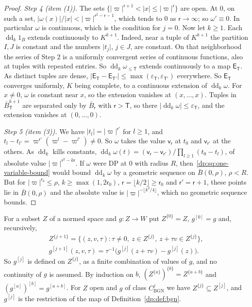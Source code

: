 \documentclass[11pt]{amsart}
\theoremstyle{definition}
\theoremstyle{remark}
\numberwithin{equation}{section}
\newcommand{\abs}[1]{\lvert #1\rvert}
\theoremstyle{plain}
\theoremstyle{definition}
\theoremstyle{plain}
\begin{document}
\begin{proof}
\emph{Step 4 (item (1)).} The sets $\{\abs\varpi^{\mathsf r+1}<\abs x\le\abs\varpi^{\mathsf r}\}$ are open. At $0$, on such a set, $\abs{\omega(x)}/\abs x<\abs\varpi^{\mathsf r^2-\mathsf r-1}$, which tends to $0$ as $\mathsf r\to\infty$; so $\omega'\equiv0$. In particular $\omega$ is continuous, which is the condition for $j=0$. Now let $k\ge1$. Each $\operatorname{dd}_k1_B$ extends continuously to $K^{k+1}$. Indeed, near a tuple of $K^{k+1}$ the partition $I,J$ is constant and the numbers $\abs{t_j}$, $j\in J$, are constant. On that neighborhood the series of Step 2 is a uniformly convergent series of continuous functions, also at tuples with repeated entries. So $\operatorname{dd}_k\omega_{\le\mathsf T}$ extends continuously to a map $\mathsf E_{\mathsf T}$. As distinct tuples are dense, $\abs{\mathsf E_{\mathsf T}-\mathsf E_{\mathsf T'}}\le\max(\varepsilon_{\mathsf T},\varepsilon_{\mathsf T'})$ everywhere. So $\mathsf E_{\mathsf T}$ converges uniformly, $K$ being complete, to a continuous extension of $\operatorname{dd}_k\omega$. For $x\ne0$, $\omega$ is constant near $x$, so the extension vanishes at $(x,\dots,x)$. Tuples in $\bar B_{\mathsf T}^{k+1}$ are separated only by $\bar B_{\mathsf r}$ with $\mathsf r>\mathsf T$, so there $\abs{\operatorname{dd}_k\omega}\le\varepsilon_{\mathsf T}$, and the extension vanishes at $(0,\dots,0)$.

\emph{Step 5 (item (3)).} We have $\abs{t_l}=\abs\varpi^{\mathsf r'}$ for $l\ge1$, and $t_l-t_{l'}=\varpi^{\mathsf r'}(\varpi^l-\varpi^{l'})\ne0$. So $\omega$ takes the value $\mathsf v_{\mathsf r}$ at $t_0$ and $\mathsf v_{\mathsf r'}$ at the others. As $\operatorname{dd}_k$ kills constants, $\operatorname{dd}_k\omega(t)=(\mathsf v_{\mathsf r}-\mathsf v_{\mathsf r'})/\prod_{l\ge1}(t_0-t_l)$, of absolute value $\abs\varpi^{\mathsf r^2-k\mathsf r}$. If $\omega$ were DP at $0$ with radius $R$, then~\eqref{dp:sq:one-variable-bound} would bound $\operatorname{dd}_k\omega$ by a geometric sequence on $\bar B(0,\rho)$, $\rho<R$. But for $\abs\varpi^{\mathsf r_0}\le\rho$, $k\ge\max(1,2\mathsf r_0)$, $\mathsf r=\lfloor k/2\rfloor\ge\mathsf r_0$ and $\mathsf r'=\mathsf r+1$, these points lie in $\bar B(0,\rho)$ and the absolute value is $\abs\varpi^{-\lfloor k^2/4\rfloor}$, which no geometric sequence bounds.
\end{proof}

For a subset $Z$ of a normed space and $g\colon Z\to W$ put $Z^{\{0\}}=Z$, $g^{[0]}=g$ and, recursively,
\begin{gather*}
 Z^{\{j+1\}}=\{(z,v,\tau):\tau\ne0,\ z\in Z^{\{j\}},\ z+\tau v\in Z^{\{j\}}\},\\
 g^{[j+1]}(z,v,\tau)=\tau^{-1}\bigl(g^{[j]}(z+\tau v)-g^{[j]}(z)\bigr).
\end{gather*}
So $g^{[j]}$ is defined on $Z^{\{j\}}$, as a finite combination of values of $g$, and no continuity of $g$ is assumed. By induction on $b$, $(Z^{\{a\}})^{\{b\}}=Z^{\{a+b\}}$ and $(g^{[a]})^{[b]}=g^{[a+b]}$. For $Z$ open and $g$ of class $C^j_{\mathrm{BGN}}$ we have $Z^{\{j\}}\subseteq Z^{[j]}$, and $g^{[j]}$ is the restriction of the map of Definition~\ref{dp:def:bgn}.
\end{document}

